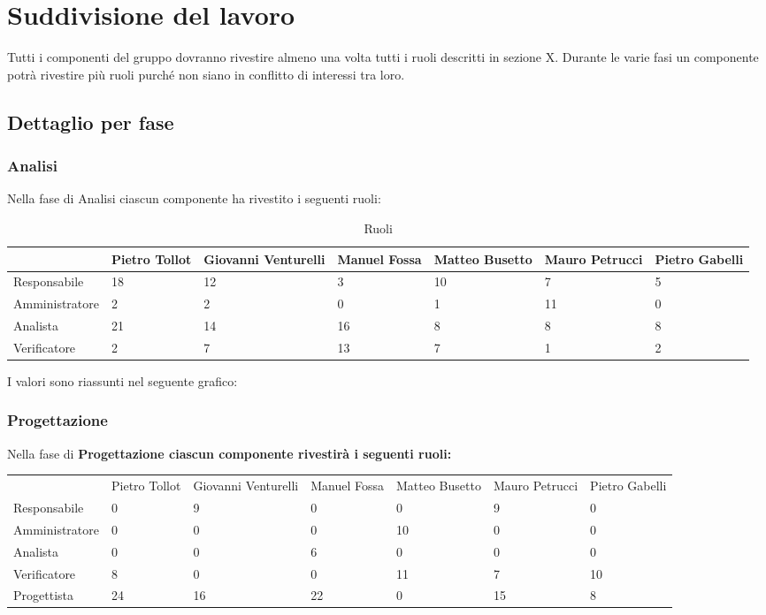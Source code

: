 \section{Suddivisione del lavoro}

Tutti i componenti del gruppo dovranno rivestire almeno una volta tutti i ruoli descritti in sezione X.
Durante le varie fasi un componente potr\`{a} rivestire pi\`{u} ruoli purch\'{e} non siano in conflitto di interessi tra loro.

\subsection{Dettaglio per fase}


\subsubsection{Analisi}
Nella fase di Analisi ciascun componente ha rivestito i seguenti ruoli:

\label{tab:ruoli}
\begin{table}[h] %
	\begin{tabular}{p{} p{}p{} p{}p{} p{}p{}}
 		\toprule & Pietro Tollot & Giovanni Venturelli & Manuel Fossa & Matteo Busetto & Mauro Petrucci & Pietro Gabelli \\
		\midrule Responsabile & 18 & 12 & 3 & 10 & 7 & 5 \\
		\midrule Amministratore & 2 & 2 & 0 & 1 & 11 & 0 \\
		\midrule Analista & 21 & 14 & 16 & 8 & 8 & 8 \\
		\midrule Verificatore & 2 & 7 & 13 & 7 & 1 & 2 \\
		\bottomrule
	\end{tabular}
	\caption{Ruoli}
\end{table}

I valori sono riassunti nel seguente grafico:


\subsubsection{Progettazione}
Nella fase di \bf{Progettazione} ciascun componente rivestir\`{a} i seguenti ruoli:

\begin{table}[h] %
\begin{tabular}{lllllll}
 & Pietro Tollot & Giovanni Venturelli & Manuel Fossa & Matteo Busetto & Mauro Petrucci & Pietro Gabelli \\
Responsabile & 0 & 9 & 0 & 0 & 9 & 0 \\
Amministratore & 0 & 0 & 0 & 10 & 0 & 0 \\
Analista & 0 & 0 & 6 & 0 & 0 & 0 \\
Verificatore & 8 & 0 & 0 & 11 & 7 & 10 \\
Progettista & 24 & 16 & 22 & 0 & 15 & 8 
\end{tabular}
\end{table}

